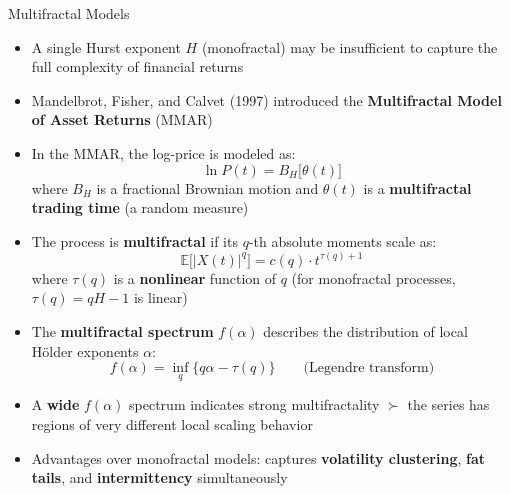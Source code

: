 \documentclass[9pt, aspectratio=169, t]{beamer}
\theoremstyle{definition}
\newcommand{\E}{\mathbb{E}}
\begin{document}
\begin{frame}{Multifractal Models}
    \begin{itemize}
        \item A single Hurst exponent $H$ (monofractal) may be insufficient to capture the full complexity of financial returns
        \item Mandelbrot, Fisher, and Calvet (1997) introduced the \textbf{Multifractal Model of Asset Returns} (MMAR)
        \item In the MMAR, the log-price is modeled as:
        \[
            \ln P(t) = B_H\bigl[\theta(t)\bigr]
        \]
        where $B_H$ is a fractional Brownian motion and $\theta(t)$ is a \textbf{multifractal trading time} (a random measure)
        \item The process is \textbf{multifractal} if its $q$-th absolute moments scale as:
        \[
            \E\bigl[|X(t)|^q\bigr] = c(q) \cdot t^{\tau(q) + 1}
        \]
        where $\tau(q)$ is a \textbf{nonlinear} function of $q$ (for monofractal processes, $\tau(q) = qH - 1$ is linear)
        \item The \textbf{multifractal spectrum} $f(\alpha)$ describes the distribution of local H\"older exponents $\alpha$:
        \[
            f(\alpha) = \inf_q \bigl\{q\alpha - \tau(q)\bigr\} \qquad \text{(Legendre transform)}
        \]
        \item A \textbf{wide} $f(\alpha)$ spectrum indicates strong multifractality $\succ$ the series has regions of very different local scaling behavior
        \item Advantages over monofractal models: captures \textbf{volatility clustering}, \textbf{fat tails}, and \textbf{intermittency} simultaneously
    \end{itemize}
\end{frame}
\end{document}
